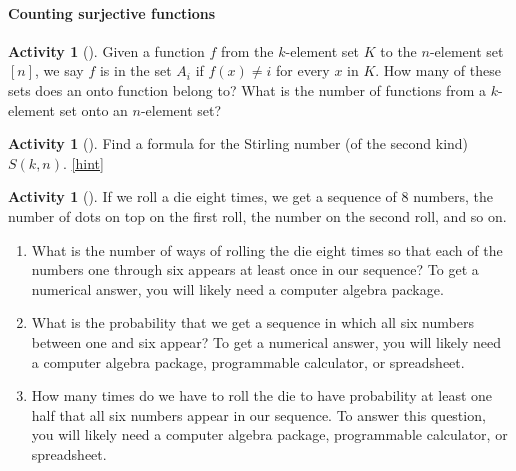 \documentclass[10pt,]{book}
\theoremstyle{plain}
\theoremstyle{definition}
\theoremstyle{definition}
\theoremstyle{definition}
\newtheorem{activity}[project]{Activity}
\numberwithin{equation}{chapter}
\begin{document}
\paragraph[{Counting surjective functions}]{Counting surjective functions}\hypertarget{paragraphs-7}{}
\begin{activity}[]\label{numontofun}
\hypertarget{p-1226}{}%
Given a function \(f\) from the \(k\)-element set \(K\) to the \(n\)-element set \([n]\), we say \(f\) is in the set \(A_i\) if \(f(x)\not= i\) for every \(x\) in \(K\). How many of these  sets does an onto function belong to? What is the number of functions from a \(k\)-element set onto an \(n\)-element set?%
\end{activity}
\begin{activity}[]\label{act_stirlingpie}
\hypertarget{p-1228}{}%
Find a formula for the Stirling number (of the second kind) \(S(k,n)\).%
\hfill{\tiny\hyperlink{a-231}{[hint]}\hypertarget{q-231}{}}\end{activity}
\begin{activity}[]\label{activity-225}
\hypertarget{p-1231}{}%
If we roll a die eight times, we get a sequence of 8 numbers, the number of dots on top on the first roll, the number on the second roll, and so on.%
\begin{enumerate}[font=\bfseries,label=(\alph*),ref=\alph*]
\item\label{task-230} \hypertarget{p-1232}{}%
What is the number of ways of rolling the die eight times so that each of the numbers one through six appears at least once in our sequence? To get a numerical answer, you will likely need a computer algebra package.%
\item\label{task-231} \hypertarget{p-1234}{}%
What is the probability that we get a sequence in which all six numbers between one and six appear? To get a numerical answer, you will likely need a computer algebra package, programmable calculator, or spreadsheet.%
\item\label{task-232} \hypertarget{p-1236}{}%
How many times do we have to roll the die to have probability at least one half that all six numbers appear in our sequence. To answer this question, you will likely need a computer algebra package, programmable calculator, or spreadsheet.%
\end{enumerate}
\end{activity}
\typeout{************************************************}
\typeout{************************************************}
\end{document}
